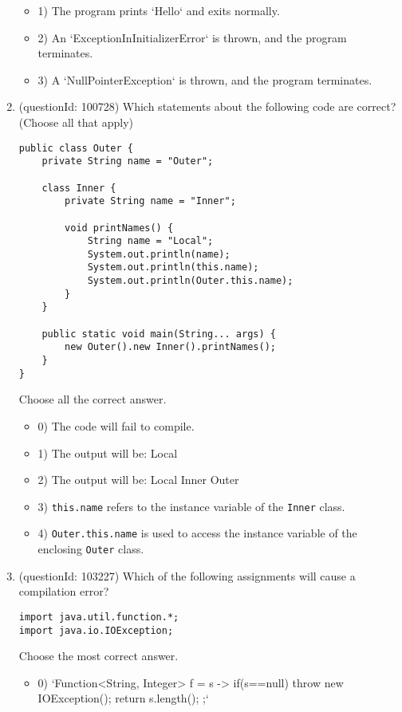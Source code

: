 \documentclass[12pt]{article}
\begin{document}
\begin{enumerate}[label=(\arabic*)]
\begin{itemize}
\item 1) The program prints `Hello` and exits normally.

\item 2) An `ExceptionInInitializerError` is thrown, and the program terminates.

\item 3) A `NullPointerException` is thrown, and the program terminates.

\end{itemize}
\item (questionId: 100728) Which statements about the following code are correct? (Choose all that apply)\n\begin{verbatim}
public class Outer {
    private String name = "Outer";

    class Inner {
        private String name = "Inner";

        void printNames() {
            String name = "Local";
            System.out.println(name);
            System.out.println(this.name);
            System.out.println(Outer.this.name);
        }
    }

    public static void main(String... args) {
        new Outer().new Inner().printNames();
    }
}
\end{verbatim}
Choose all the correct answer.\begin{itemize}
\item 0) The code will fail to compile.

\item 1) The output will be: Local

\item 2) The output will be: Local Inner Outer

\item 3) \verb|this.name| refers to the instance variable of the \verb|Inner| class.

\item 4) \verb|Outer.this.name| is used to access the instance variable of the enclosing \verb|Outer| class.

\end{itemize}
\item (questionId: 103227) Which of the following assignments will cause a compilation error?
\begin{verbatim}
import java.util.function.*;
import java.io.IOException;
\end{verbatim}
Choose the most correct answer. 
\begin{itemize}
\item 0) `Function<String, Integer> f = s -> { if(s==null) throw new IOException(); return s.length(); };`


\end{itemize}
\end{enumerate}
\end{document}
